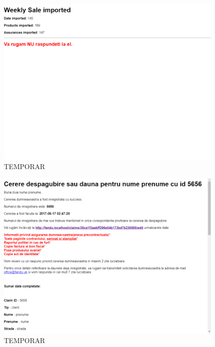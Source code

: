 	\begin{figure}
		\includegraphics[width=\linewidth]{../imagini/message_mail_weekly_import.png}
		\caption{TEMPORAR}
		\label{fig:TEMP}
	\end{figure}
	\begin{figure}
		\includegraphics[width=\linewidth]{../imagini/message_new_claim.png}
		\caption{TEMPORAR}
		\label{fig:TEMP}
	\end{figure}
